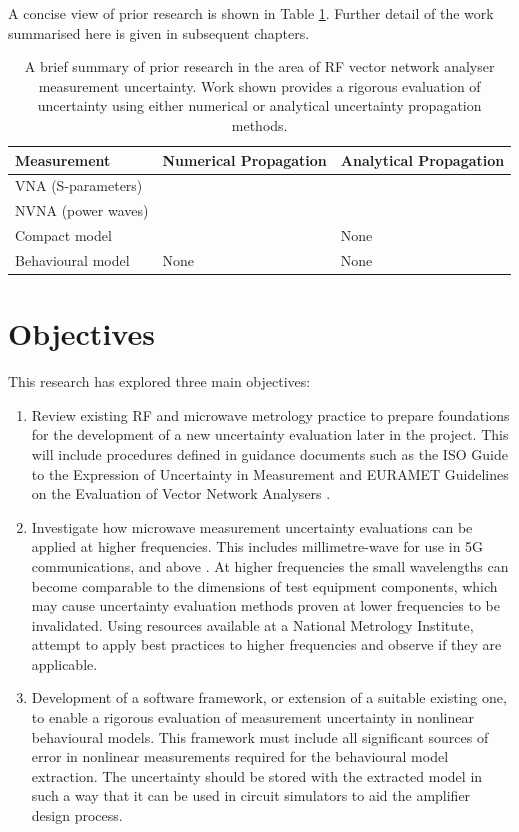 \documentclass[../thesis/thesis.tex]{subfiles}
\begin{document}
A concise view of prior research is shown in Table \ref{ch1_table_prior}. Further detail of the work summarised here is given in subsequent chapters.

\begin{table}[]
	\begin{tabular}{@{}lll@{}}
		\toprule
		Measurement        & Numerical Propagation & Analytical Propagation\\ \midrule
		VNA (S-parameters) & \cite{Hoffman_2007,VNATools}  & \cite{Lewandowski_2010B,VNATools}           \\
		NVNA (power waves) & \cite{MUFWebsite,Avolio_2015}          & \cite{Lin_2012}           \\
		Compact model      & \cite{Williams_2016,Cheron_2018}    & None           \\
		Behavioural model  & None          &  None          \\ \bottomrule
	\end{tabular}
\caption[Summary of prior research into RF vector network analyser measurement uncertainty.]{A brief summary of prior research in the area of RF vector network analyser measurement uncertainty. Work shown provides a rigorous evaluation of uncertainty using either numerical or analytical uncertainty propagation methods.}
\label{ch1_table_prior}
\end{table}

\newpage
\section{Objectives}
This research has explored three main objectives:
\begin{enumerate}
	\item Review existing RF and microwave metrology practice to prepare foundations for the development of a new uncertainty evaluation later in the project. This will include procedures defined in guidance documents such as the ISO Guide to the Expression of Uncertainty in Measurement \cite{GUM_2008} and EURAMET Guidelines on the Evaluation of Vector Network Analysers \cite{EURAMET_2011}.
	\item Investigate how microwave measurement uncertainty evaluations can be applied at higher frequencies. This includes millimetre-wave for use in 5G communications, and above \cite{Dahlman_2014}. At higher frequencies the small wavelengths can become comparable to the dimensions of test equipment components, which may cause uncertainty evaluation methods proven at lower frequencies to be invalidated. Using resources available at a National Metrology Institute, attempt to apply best practices to higher frequencies and observe if they are applicable.
	\item Development of a software framework, or extension of a suitable existing one, to enable a rigorous evaluation of measurement uncertainty in nonlinear behavioural models. This framework must include all significant sources of error in nonlinear measurements required for the behavioural model extraction. The uncertainty should be stored with the extracted model in such a way that it can be used in circuit simulators to aid the amplifier design process.
\end{enumerate}
\end{document}
